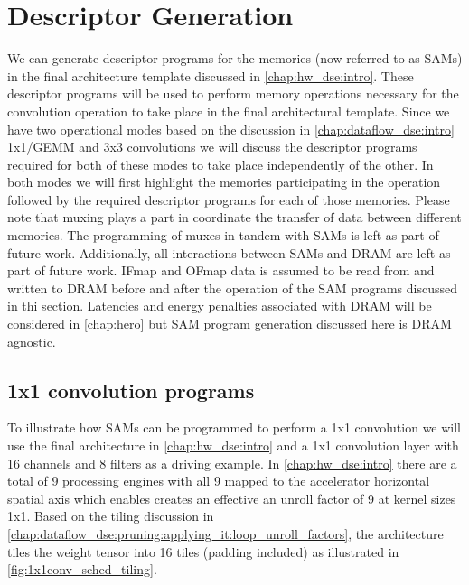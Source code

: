 \clearpage


\section{Descriptor Generation}
\label{chap:sams:acc_scheduling}

We can generate descriptor programs for the memories (now referred to as SAMs)
in the final architecture template discussed in \autoref{chap:hw_dse:intro}.
These descriptor programs will be used to perform memory operations necessary
for the convolution operation to take place in the final architectural template.
Since we have two operational modes based on the discussion in
\autoref{chap:dataflow_dse:intro} 1x1/GEMM and 3x3 convolutions we will discuss the
descriptor programs required for both of these modes to take place independently of
the other. In both modes we will first highlight the memories participating in
the operation followed by the required descriptor programs for each of those
memories. Please note that muxing plays a part in coordinate the transfer of
data between different memories. The programming of muxes in tandem with SAMs is
left as part of future work. Additionally, all interactions between SAMs and
DRAM are left as part of future work. IFmap and OFmap data is assumed to be read
from and written to DRAM before and after the operation of the SAM programs
discussed in thi section. Latencies and energy penalties associated with DRAM
will be considered in \autoref{chap:hero} but SAM program generation discussed
here is DRAM agnostic.

\subsection{1x1 convolution programs}
\label{chap:sams:acc_scheduling:1x1}

To illustrate how SAMs can be programmed to perform a 1x1 convolution we will
use the final architecture in \autoref{chap:hw_dse:intro} and a 1x1 convolution
layer with 16 channels and 8 filters as a driving example. In
\autoref{chap:hw_dse:intro} there are a total of 9 processing engines with all 9
mapped to the accelerator horizontal spatial axis which enables creates an
effective an unroll factor of 9 at kernel sizes 1x1. Based on the tiling
discussion in
\autoref{chap:dataflow_dse:pruning:applying_it:loop_unroll_factors}, the
architecture tiles the weight tensor into 16 tiles (padding included) as
illustrated in \autoref{fig:1x1conv_sched_tiling}.

